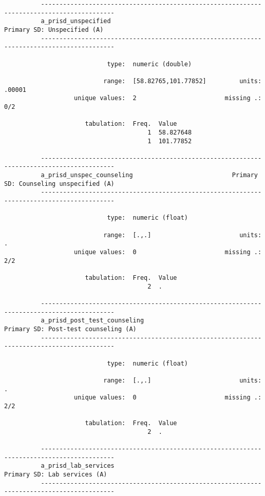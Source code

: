 \documentclass{article}
\begin{document}
\begin{verbatim}
          ------------------------------------------------------------------------------------------
          a_prisd_unspecified                                            Primary SD: Unspecified (A)
          ------------------------------------------------------------------------------------------
          
                            type:  numeric (double)
          
                           range:  [58.82765,101.77852]         units:  .00001
                   unique values:  2                        missing .:  0/2
          
                      tabulation:  Freq.  Value
                                       1  58.827648
                                       1  101.77852
          
          ------------------------------------------------------------------------------------------
          a_prisd_unspec_counseling                           Primary SD: Counseling unspecified (A)
          ------------------------------------------------------------------------------------------
          
                            type:  numeric (float)
          
                           range:  [.,.]                        units:  .
                   unique values:  0                        missing .:  2/2
          
                      tabulation:  Freq.  Value
                                       2  .
          
          ------------------------------------------------------------------------------------------
          a_prisd_post_test_counseling                          Primary SD: Post-test counseling (A)
          ------------------------------------------------------------------------------------------
          
                            type:  numeric (float)
          
                           range:  [.,.]                        units:  .
                   unique values:  0                        missing .:  2/2
          
                      tabulation:  Freq.  Value
                                       2  .
          
          ------------------------------------------------------------------------------------------
          a_prisd_lab_services                                          Primary SD: Lab services (A)
          ------------------------------------------------------------------------------------------
          

\end{verbatim}
\end{document}
